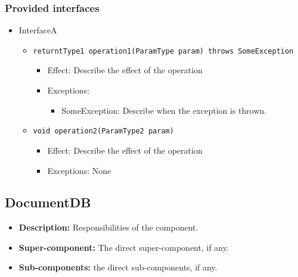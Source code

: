 \documentclass[a4paper,10pt]{article}
\begin{document}
\subsubsection*{Provided interfaces}
\begin{itemize}
    \item InterfaceA
    \begin{itemize}
        \item \texttt{returntType1 operation1(ParamType param) throws SomeException}
        \begin{itemize}
            \item Effect: Describe the effect of the operation
            \item Exceptions:
            \begin{itemize}
                \item SomeException: Describe when the exception is thrown.
            \end{itemize}
		\end{itemize}
		
        \item \texttt{void operation2(ParamType2 param)}
        \begin{itemize}
            \item Effect: Describe the effect of the operation
            \item Exceptions: None
        \end{itemize}  
    \end{itemize}
\end{itemize}

\subsection{DocumentDB}
\begin{itemize}
    \item \textbf{Description:} Responsibilities of the component.
    \item \textbf{Super-component:} The direct super-component, if any.
    \item \textbf{Sub-components:} the direct sub-components, if any.
\end{itemize}
\end{document}
